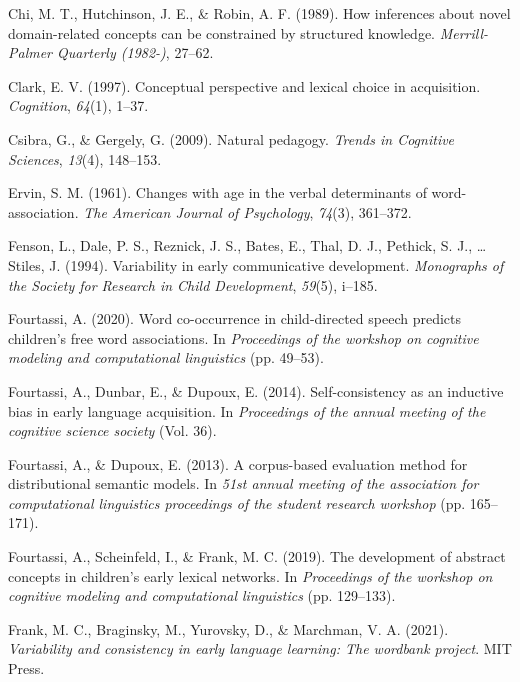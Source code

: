\documentclass[english,,man]{apa6}
\begin{document}
\leavevmode\hypertarget{ref-chi1989}{}%
Chi, M. T., Hutchinson, J. E., \& Robin, A. F. (1989). How inferences about novel domain-related concepts can be constrained by structured knowledge. \emph{Merrill-Palmer Quarterly (1982-)}, 27--62.

\leavevmode\hypertarget{ref-clark1997}{}%
Clark, E. V. (1997). Conceptual perspective and lexical choice in acquisition. \emph{Cognition}, \emph{64}(1), 1--37.

\leavevmode\hypertarget{ref-csibra2009}{}%
Csibra, G., \& Gergely, G. (2009). Natural pedagogy. \emph{Trends in Cognitive Sciences}, \emph{13}(4), 148--153.

\leavevmode\hypertarget{ref-ervin1961changes}{}%
Ervin, S. M. (1961). Changes with age in the verbal determinants of word-association. \emph{The American Journal of Psychology}, \emph{74}(3), 361--372.

\leavevmode\hypertarget{ref-fenson94}{}%
Fenson, L., Dale, P. S., Reznick, J. S., Bates, E., Thal, D. J., Pethick, S. J., \ldots{} Stiles, J. (1994). Variability in early communicative development. \emph{Monographs of the Society for Research in Child Development}, \emph{59}(5), i--185.

\leavevmode\hypertarget{ref-fourtassi2020word}{}%
Fourtassi, A. (2020). Word co-occurrence in child-directed speech predicts children's free word associations. In \emph{Proceedings of the workshop on cognitive modeling and computational linguistics} (pp. 49--53).

\leavevmode\hypertarget{ref-fourtassi2014}{}%
Fourtassi, A., Dunbar, E., \& Dupoux, E. (2014). Self-consistency as an inductive bias in early language acquisition. In \emph{Proceedings of the annual meeting of the cognitive science society} (Vol. 36).

\leavevmode\hypertarget{ref-fourtassi2013}{}%
Fourtassi, A., \& Dupoux, E. (2013). A corpus-based evaluation method for distributional semantic models. In \emph{51st annual meeting of the association for computational linguistics proceedings of the student research workshop} (pp. 165--171).

\leavevmode\hypertarget{ref-fourtassi2019}{}%
Fourtassi, A., Scheinfeld, I., \& Frank, M. C. (2019). The development of abstract concepts in children's early lexical networks. In \emph{Proceedings of the workshop on cognitive modeling and computational linguistics} (pp. 129--133).

\leavevmode\hypertarget{ref-frank2021variability}{}%
Frank, M. C., Braginsky, M., Yurovsky, D., \& Marchman, V. A. (2021). \emph{Variability and consistency in early language learning: The wordbank project}. MIT Press.
\end{document}
